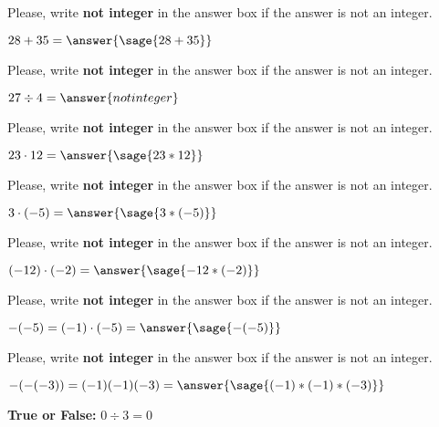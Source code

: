 \documentclass{ximera}
\begin{document}
\begin{problem}
Please, write \textbf{not integer} in the answer box if the answer is not an integer.

$28+35=\answer{\sage{28+35}}$
\end{problem}



\begin{problem}
Please, write \textbf{not integer} in the answer box if the answer is not an integer.

$27\div 4=\answer{not integer}$
\end{problem}


\begin{problem}
Please, write \textbf{not integer} in the answer box if the answer is not an integer.

$23\cdot 12=\answer{\sage{23*12}}$
\end{problem}

\begin{problem}
Please, write \textbf{not integer} in the answer box if the answer is not an integer.

$3\cdot (-5)=\answer{\sage{3*(-5)}}$
\end{problem}


\begin{problem}
Please, write \textbf{not integer} in the answer box if the answer is not an integer.

$(-12)\cdot(-2)=\answer{\sage{-12*(-2)}}$
\end{problem}


\begin{problem}
Please, write \textbf{not integer} in the answer box if the answer is not an integer.

$-(-5)=(-1)\cdot(-5)=\answer{\sage{-(-5)}}$
\end{problem}


\begin{problem}
Please, write \textbf{not integer} in the answer box if the answer is not an integer.

$-(-(-3))=(-1)(-1)(-3)=\answer{\sage{(-1)*(-1)*(-3)}}$
\end{problem}




\begin{problem}
\textbf{True or False:} $0\div 3= 0$ 
\begin{multipleChoice*}
\end{multipleChoice*}
\end{problem}
\end{document}
